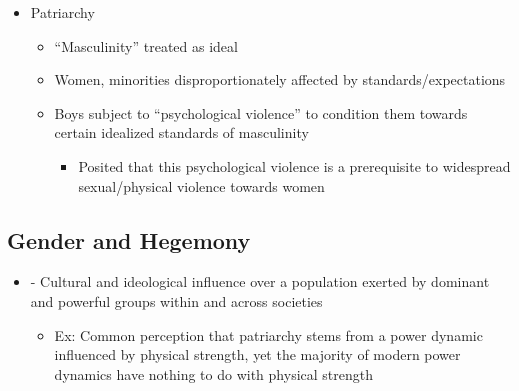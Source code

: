 \documentclass[a4paper]{article}
\begin{document}
\begin{itemize}
\begin{itemize}
    \item Patriarchy \begin{itemize}
      \item ``Masculinity'' treated as ideal
      \item Women, minorities disproportionately affected by standards/expectations
      \item Boys subject to ``psychological violence'' to condition them towards certain idealized
      standards of masculinity \begin{itemize}
        \item Posited that this psychological violence is a prerequisite to widespread sexual/physical violence towards women
      \end{itemize}
    \end{itemize}
  \end{itemize}
\end{itemize}

\subsection{Gender and Hegemony}
\begin{itemize}
  \item {} - Cultural and ideological influence over a population exerted by dominant and powerful groups within and across societies \begin{itemize}
    \item Ex: Common perception that patriarchy stems from a power dynamic influenced by physical
    strength, yet the majority of modern power dynamics have nothing to do with physical strength
  \end{itemize}
\end{itemize}
\end{document}
